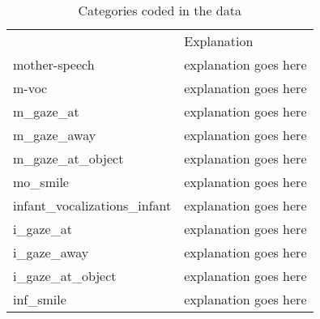 \begin{table}
\center
	\begin{tabular}{>{\ttfamily}ll} 
	\toprule
	{\rmfamily Category}			& Explanation \\
	\cmidrule(lr){1-1} \cmidrule(lr){2-2}
    mother-speech					& explanation goes here \\
	m-voc							& explanation goes here \\
	m\_gaze\_at						& explanation goes here \\
	m\_gaze\_away					& explanation goes here \\
	m\_gaze\_at\_object				& explanation goes here \\
	mo\_smile						& explanation goes here \\
	\cmidrule(lr){1-1} \cmidrule(lr){2-2}
	infant\_vocalizations\_infant	& explanation goes here \\
	i\_gaze\_at						& explanation goes here \\
	i\_gaze\_away					& explanation goes here \\
	i\_gaze\_at\_object				& explanation goes here \\
	inf\_smile						& explanation goes here \\
	\bottomrule
	\end{tabular}
	\label{tab:categories}
	\caption{Categories coded in the data}
\end{table}